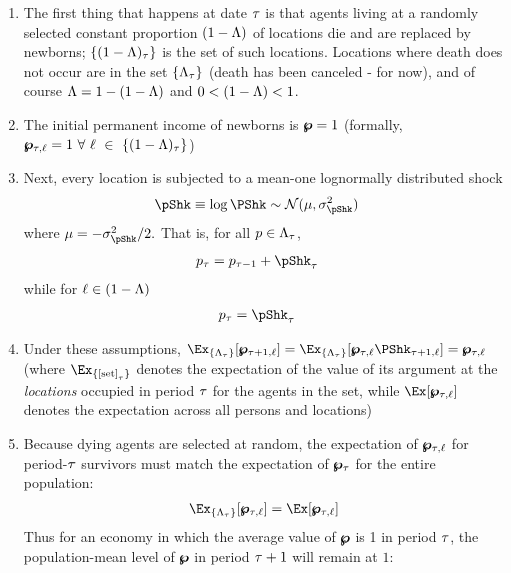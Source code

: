 \documentclass[../BufferStockTheory.tex]{subfiles}\usepackage{ApndxSteadyState}
\begin{document}
  \begin{enumerate}
  \item The first thing that happens at date $\tau$ is that agents living at a randomly selected constant proportion $(1-\Lambda)$ of locations die and are replaced by newborns; $\{(1-\Lambda)_{\tau}\}$ is the set of such locations.  Locations where death does not occur are in the set  $\{\Lambda_{\tau}\}$ (death has been canceled - for now), and of course $\Lambda=1-(1-\Lambda)$ and $0 < (1-\Lambda) < 1$.
  \item The initial permanent income of newborns is  $\pmb{\wp}=1$ (formally, $\pmb{\wp}_{\tau,\ell} = 1~\forall~\ell~\in~\{(1-\Lambda)_{\tau}\}$)
  \item Next, every location is subjected to a mean-one lognormally distributed shock
    \begin{align}
      \pShk & \equiv \log \PShk \sim \mathcal{N}(\pShkMean,\sigma^{2}_{\pShk}) \label{eq:pShkDef}
    \end{align}
    where $\pShkMean = -\sigma^{2}_{\pShk}/2.$  That is, for all $p \in \Lambda_{\tau}$, 
    \begin{align}
      \pLog_{\tAbs} & = \pLog_{\tAbs-1}+\pShk_{\tAbs} \label{eq:pRandomwalk}
    \end{align}
    while for $\ell \in (1-\Lambda)$
    \begin{align}
      \pLog_{\tAbs} & = \pShk_{\tAbs} \label{eq:pStartsAtZero}
    \end{align}
  \item Under these assumptions, $\Ex_{\{\Liv_{\tAbs}\}}[\pLev_{\tAbs+1,\posn}]=\Ex_{\{\Liv_{\tAbs}\}}[\pLev_{\tAbs,\posn}\PShk_{\tAbs+1,\posn}]=\pLev_{\tAbs,\posn}$ (where $\Ex_{\{\text{[set]}_{\tAbs}\}}$ denotes the expectation of the value of its argument at the \emph{locations} occupied in period $\tau$ for the agents in the set, while  $\Ex[\pLev_{\tAbs,\posn}]$ denotes the expectation across all persons and locations)      
  \item Because dying agents are selected at random, the expectation of $\pmb{\wp}_{\tau,\ell}$ for period-$\tau$ survivors must match the expectation of $\pmb{\wp}_{\tau}$ for the entire population:
    \begin{align}
      \Ex_{\{\Liv_{\tAbs}\}}[\pLev_{\tAbs,\posn}]=\Ex[\pLev_{\tAbs,\posn}] \label{eq:pLevLivIsOne}
    \end{align}
    Thus for an economy in which the average value of $\pmb{\wp}$ is 1 in period $\tau$, the population-mean level of $\pmb{\wp}$ in period $\tau+1$ will remain at $1$:
  \end{enumerate}
\end{document}
